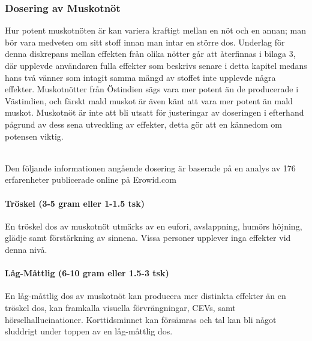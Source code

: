





\subsubsection{Dosering av Muskotnöt}
Hur potent muskotnöten är kan variera kraftigt mellan en nöt och en annan;
man bör vara medveten om sitt stoff innan man intar en större dos. Underlag för denna diskrepans mellan effekten från olika nötter går att återfinnas i bilaga 3,
där upplevde användaren fulla effekter som beskrivs senare i detta kapitel medans hans två vänner som intagit samma mängd av stoffet inte upplevde några effekter.
Muskotnötter från Östindien sägs vara mer potent än de producerade i Västindien, och färskt
mald muskot är även känt att vara mer potent än mald muskot.\cite{entheogenreview}
Muskotnöt är inte att bli utsatt för justeringar av doseringen i efterhand pågrund av dess sena utveckling av effekter, detta gör att en kännedom om potensen viktig.
\cite{entheogenreview}

\\

Den följande informationen angående dosering är baserade på en analys av 176 erfarenheter publicerade online på Erowid.com

\paragraph{Tröskel (3-5 gram eller 1-1.5 tsk)}
En tröskel dos av muskotnöt utmärks av en eufori, avslappning, humörs höjning, glädje samt
förstärkning av sinnena.
Vissa personer upplever inga effekter vid denna nivå.

\paragraph{Låg-Måttlig (6-10 gram eller 1.5-3 tsk)}
En låg-måttlig dos av muskotnöt kan producera mer distinkta effekter än en tröskel dos, kan framkalla visuella förvrängningar, CEVs, samt hörselhallucinationer.
Korttidsminnet kan försämras och tal kan bli något sluddrigt under toppen av en
låg-måttlig dos.

